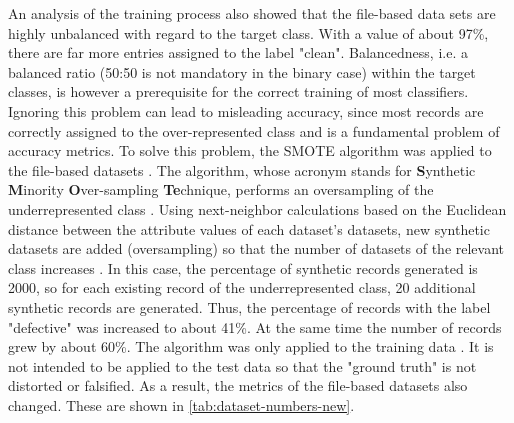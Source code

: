 An analysis of the training process also showed that the file-based data sets are highly unbalanced with regard to the target class. With a value of about 97\%, there are far more entries assigned to the label "clean". Balancedness, i.e. a balanced ratio (50:50 is not mandatory in the binary case) within the target classes, is however a prerequisite for the correct training of most classifiers. Ignoring this problem can lead to misleading accuracy, since most records are correctly assigned to the over-represented class and is a fundamental problem of accuracy metrics. To solve this problem, the SMOTE algorithm was applied to the file-based datasets \cite{Chawla2002}. The algorithm, whose acronym stands for \textbf{S}ynthetic \textbf{M}inority \textbf{O}ver-sampling \textbf{Te}chnique, performs an oversampling of the underrepresented class \cite{Chawla2002}. Using next-neighbor calculations based on the Euclidean distance between the attribute values of each dataset's datasets, new synthetic datasets are added (oversampling) so that the number of datasets of the relevant class increases \cite{Chawla2002}. In this case, the percentage of synthetic records generated is 2000, so for each existing record of the underrepresented class, 20 additional synthetic records are generated. Thus, the percentage of records with the label "defective" was increased to about 41\%. At the same time the number of records grew by about 60\%. The algorithm was only applied to the training data \cite{Chawla2002} . It is not intended to be applied to the test data so that the "ground truth" is not distorted or falsified. As a result, the metrics of the file-based datasets also changed. These are shown in \autoref{tab:dataset-numbers-new}.

